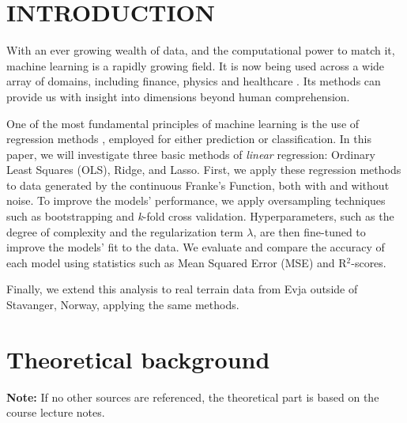 \documentclass{article}
\begin{document}
\begin{multicols}{2}
\vspace{0pt}
\section*{INTRODUCTION} 
With an ever growing wealth of data, and the computational power to match it, machine learning is a rapidly growing field. It is now being used across a wide array of domains, including finance, physics and healthcare \cite{sarker_machine_2021}. Its methods can provide us with insight into dimensions beyond human comprehension.

One of the most fundamental principles of machine learning is the use of regression methods \cite{hastie_elements_2009}, employed for either prediction or classification. In this paper, we will investigate three basic methods of \textit{linear} regression: Ordinary Least Squares (OLS), Ridge, and Lasso. First, we apply these regression methods to data generated by the continuous Franke’s Function\cite{franke_critical_1975}, both with and without noise. To improve the models’ performance, we apply oversampling techniques such as bootstrapping and \textit{k}-fold cross validation. Hyperparameters, such as the degree of complexity and the regularization term $\lambda$, are then fine-tuned to improve the models’ fit to the data. We evaluate and compare the accuracy of each model using statistics such as Mean Squared Error (MSE) and R$^2$-scores.

Finally, we extend this analysis to real terrain data from Evja outside of Stavanger, Norway, applying the same methods.


\section*{Theoretical background}
\textbf{Note:} If no other sources are referenced, the theoretical part is based on the course lecture notes. \cite{hjorth-jensen_applied_2021}


\end{multicols}
\end{document}
